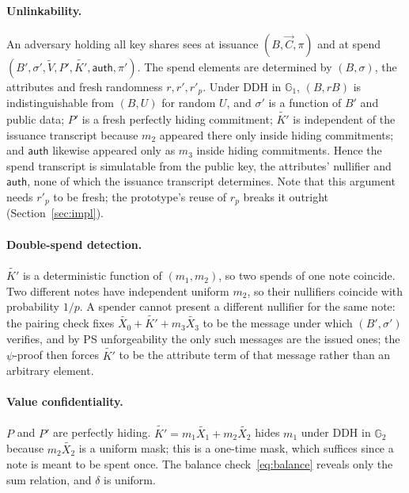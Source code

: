 \documentclass[10pt,a5paper]{article}
\newcommand{\K}[1]{#1}                      %
\newcommand{\Go}[1]{#1}                     %
\newcommand{\Gt}[1]{\tilde{#1}}             %
\newcommand{\K}[1]{{\color{ScalarCol}#1}}   %
\newcommand{\Go}[1]{{\color{GoneCol}#1}}    %
\newcommand{\Gt}[1]{{\color{GtwoCol}#1}}    %
\newcommand{\GG}[1]{\mathbb{G}_{#1}}
\newcommand{\auth}{\mathsf{auth}}
\newcommand{\vv}[1]{\vec{#1}}
\begin{document}
\paragraph{Unlinkability.} An adversary holding all key shares sees at
issuance $(\Go{B}, \vv{C}, \pi)$ and at spend
$(\Go{B'}, \Go{\sigma'}, \Gt{V}, \Go{P'}, \Gt{K'}, \auth, \pi')$. The spend
elements are determined by $(\Go{B},\Go{\sigma})$, the attributes and fresh
randomness $\K{r},\K{r'},\K{r'_p}$. Under DDH in $\GG{1}$, $(\Go{B},\K{r}\Go{B})$
is indistinguishable from $(\Go{B},\Go{U})$ for random $\Go{U}$, and
$\Go{\sigma'}$ is a function of $\Go{B'}$ and public data; $\Go{P'}$ is a fresh
perfectly hiding commitment; $\Gt{K'}$ is independent of the issuance
transcript because $\K{m_2}$ appeared there only inside hiding commitments;
and $\auth$ likewise appeared only as $\K{m_3}$ inside hiding commitments.
Hence the spend transcript is simulatable from the public key, the attributes'
nullifier and $\auth$, none of which the issuance transcript determines. Note
that this argument needs $\K{r'_p}$ to be fresh; the prototype's reuse of
$\K{r_p}$ breaks it outright (Section~\ref{sec:impl}).

\paragraph{Double-spend detection.} $\Gt{K'}$ is a deterministic function of
$(\K{m_1},\K{m_2})$, so two spends of one note coincide. Two different notes
have independent uniform $\K{m_2}$, so their nullifiers coincide with
probability $1/p$. A spender cannot present a different nullifier for the same
note: the pairing check fixes $\Gt{X_0} + \Gt{K'} + \K{m_3}\Gt{X_3}$ to be the
message under which $(\Go{B'},\Go{\sigma'})$ verifies, and by PS unforgeability
the only such messages are the issued ones; the $\psi$-proof then forces
$\Gt{K'}$ to be the attribute term of that message rather than an arbitrary
element.

\paragraph{Value confidentiality.} $\Go{P}$ and $\Go{P'}$ are perfectly
hiding. $\Gt{K'} = \K{m_1}\Gt{X_1} + \K{m_2}\Gt{X_2}$ hides $\K{m_1}$ under DDH in
$\GG{2}$ because $\K{m_2}\Gt{X_2}$ is a uniform mask; this is a one-time mask,
which suffices since a note is meant to be spent once. The balance
check~\eqref{eq:balance} reveals only the sum relation, and $\K{\delta}$ is
uniform.
\end{document}

